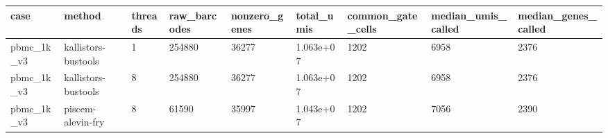 \begin{tabular}{lllllllll}
\toprule
case & method & threads & raw\_barcodes & nonzero\_genes & total\_umis & common\_gate\_cells & median\_umis\_called & median\_genes\_called \\
\midrule
pbmc\_1k\_v3 & kallistors-bustools & 1 & 254880 & 36277 & 1.063e+07 & 1202 & 6958 & 2376 \\
pbmc\_1k\_v3 & kallistors-bustools & 8 & 254880 & 36277 & 1.063e+07 & 1202 & 6958 & 2376 \\
pbmc\_1k\_v3 & piscem-alevin-fry & 8 & 61590 & 35997 & 1.043e+07 & 1202 & 7056 & 2390 \\
\bottomrule
\end{tabular}
